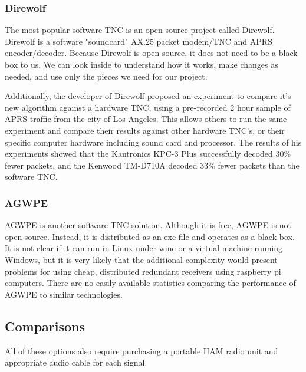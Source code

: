 \documentclass[onecolumn, draftclsnofoot, 10pt, compsoc]{IEEEtran}
\begin{document}
\subsubsection{Direwolf}
The most popular software TNC is an open source project called Direwolf.  Direwolf is a software "soundcard" AX.25 packet modem/TNC and APRS encoder/decoder.  Because Direwolf is open source, it does not need to be a black box to us.  We can look inside to understand how it works, make changes as needed, and use only the pieces we need for our project.\cite{3}

Additionally, the developer of Direwolf proposed an experiment to compare it's new algorithm against a hardware TNC, using a pre-recorded 2 hour sample of APRS traffic from the city of Los Angeles.  This allows others to run the same experiment and compare their results against other hardware TNC's, or their specific computer hardware including sound card and processor.  The results of his experiments showed that the Kantronics KPC-3 Plus successfully decoded 30\% fewer packets, and the Kenwood TM-D710A decoded 33\% fewer packets than the software TNC.\cite{4}

\subsubsection{AGWPE}
AGWPE is another software TNC solution.  Although it is free, AGWPE is not open source.  Instead, it is distributed as an exe file and operates as a black box.  It is not clear if it can run in Linux under wine or a virtual machine running Windows, but it is very likely that the additional complexity would present problems for using cheap, distributed redundant receivers using raspberry pi computers.  There are no easily available statistics comparing the performance of AGWPE to similar technologies.

\subsection{Comparisons}
All of these options also require purchasing a portable HAM radio unit and appropriate audio cable for each signal.

\begin{center}
\end{center}
\end{document}
